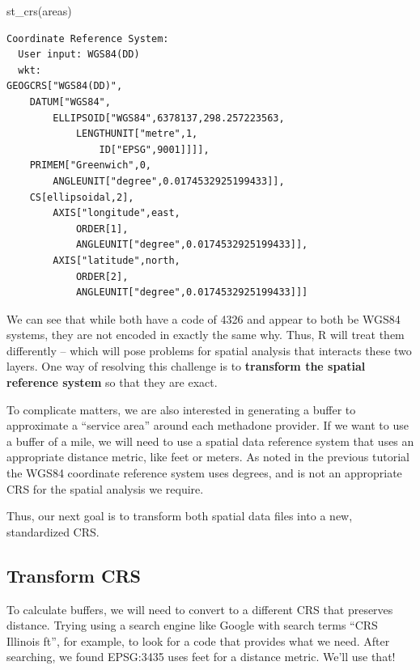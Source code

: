 \documentclass[
  letterpaper,
  DIV=11,
  numbers=noendperiod]{scrreprt}
\newenvironment{Shaded}{\begin{snugshade}}{\end{snugshade}}
\newcommand{\FunctionTok}[1]{\textcolor[rgb]{0.28,0.35,0.67}{#1}}
\newcommand{\NormalTok}[1]{\textcolor[rgb]{0.00,0.23,0.31}{#1}}
\begin{document}
\begin{Shaded}
\begin{Highlighting}[]
\FunctionTok{st\_crs}\NormalTok{(areas)}
\end{Highlighting}
\end{Shaded}

\begin{verbatim}
Coordinate Reference System:
  User input: WGS84(DD) 
  wkt:
GEOGCRS["WGS84(DD)",
    DATUM["WGS84",
        ELLIPSOID["WGS84",6378137,298.257223563,
            LENGTHUNIT["metre",1,
                ID["EPSG",9001]]]],
    PRIMEM["Greenwich",0,
        ANGLEUNIT["degree",0.0174532925199433]],
    CS[ellipsoidal,2],
        AXIS["longitude",east,
            ORDER[1],
            ANGLEUNIT["degree",0.0174532925199433]],
        AXIS["latitude",north,
            ORDER[2],
            ANGLEUNIT["degree",0.0174532925199433]]]
\end{verbatim}

We can see that while both have a code of 4326 and appear to both be
WGS84 systems, they are not encoded in exactly the same why. Thus, R
will treat them differently -- which will pose problems for spatial
analysis that interacts these two layers. One way of resolving this
challenge is to \textbf{transform the spatial reference system} so that
they are exact.

To complicate matters, we are also interested in generating a buffer to
approximate a ``service area'' around each methadone provider. If we
want to use a buffer of a mile, we will need to use a spatial data
reference system that uses an appropriate distance metric, like feet or
meters. As noted in the previous tutorial the WGS84 coordinate reference
system uses degrees, and is not an appropriate CRS for the spatial
analysis we require.

Thus, our next goal is to transform both spatial data files into a new,
standardized CRS.

\subsection{Transform CRS}\label{transform-crs-1}

To calculate buffers, we will need to convert to a different CRS that
preserves distance. Trying using a search engine like Google with search
terms ``CRS Illinois ft'', for example, to look for a code that provides
what we need. After searching, we found EPSG:3435 uses feet for a
distance metric. We'll use that!
\end{document}
